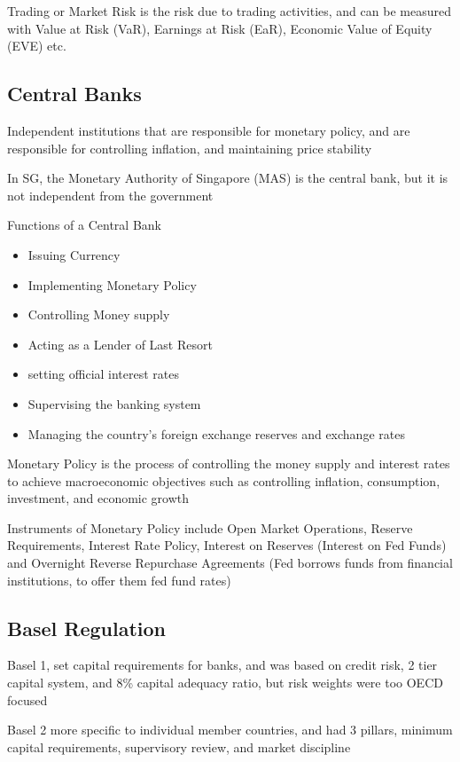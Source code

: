Trading or Market Risk is the risk due to trading activities, and can be measured with Value at Risk (VaR), Earnings at Risk (EaR), Economic Value of Equity (EVE) etc.

\subsection{Central Banks}
Independent institutions that are responsible for monetary policy, and are responsible for controlling inflation, and maintaining price stability

\begin{callout}
    In SG, the Monetary Authority of Singapore (MAS) is the central bank, but it is not independent from the government
\end{callout}

Functions of a Central Bank
\begin{itemize}
    \item Issuing Currency
    \item Implementing Monetary Policy
    \item Controlling Money supply
    \item Acting as a Lender of Last Resort
    \item setting official interest rates
    \item Supervising the banking system
    \item Managing the country's foreign exchange reserves and exchange rates
\end{itemize}

Monetary Policy is the process of controlling the money supply and interest rates to achieve macroeconomic objectives such as controlling inflation, consumption, investment, and economic growth

Instruments of Monetary Policy include Open Market Operations, Reserve Requirements, Interest Rate Policy, Interest on Reserves (Interest on Fed Funds) and Overnight Reverse Repurchase Agreements (Fed borrows funds from financial institutions, to offer them fed fund rates)

\subsection{Basel Regulation}
Basel 1, set capital requirements for banks, and was based on credit risk, 2 tier capital system, and 8\% capital adequacy ratio, but 
risk weights were too OECD focused

Basel 2 more specific to individual member countries, and had 3 pillars, minimum capital requirements, supervisory review, and market discipline

